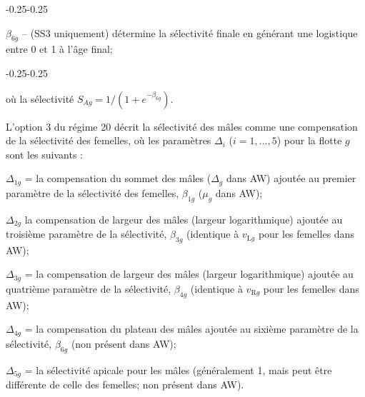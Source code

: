 \documentclass[11pt]{book}
\begin{document}
\begin{enumerate_itemize}{}{}
\begin{enumerate_itemize}{-0.25}{-0.25}
    \end{enumerate_itemize}
  \item $\beta_{6g}$ -- (SS3 uniquement) d\'{e}termine la s\'{e}lectivit\'{e} finale en g\'{e}n\'{e}rant une logistique entre 0 et 1 \`{a} l'\^{a}ge final;
    \begin{enumerate_itemize}{-0.25}{-0.25}
      \item o\`{u} la s\'{e}lectivit\'{e} $S_{Ag} = 1/(1+e^{-\beta_{6g}})$.
    \end{enumerate_itemize}
\end{enumerate_itemize}

L'option 3 du r\'{e}gime 20 d\'{e}crit la s\'{e}lectivit\'{e} des m\^{a}les comme une compensation de la s\'{e}lectivit\'{e} des femelles, o\`{u} les param\`{e}tres $\Delta_i$ ($i=1,...,5$) pour la flotte $g$ sont les suivants :
\begin{enumerate_csas}{}{}
\item $\Delta_{1g}$ = la compensation du sommet des m\^{a}les ($\Delta_g$ dans AW) ajout\'{e}e au premier param\`{e}tre de la s\'{e}lectivit\'{e} des femelles, $\beta_{1g}$ ($\mu_g$ dans AW);
\item $\Delta_{2g}$ la compensation de largeur des m\^{a}les (largeur logarithmique) ajout\'{e}e au troisi\`{e}me param\`{e}tre de la s\'{e}lectivit\'{e}, $\beta_{3g}$ (identique \`{a} $v_{\text{L}g}$ pour les femelles dans AW);
\item $\Delta_{3g}$ = la compensation de largeur des m\^{a}les (largeur logarithmique) ajout\'{e}e au quatri\`{e}me param\`{e}tre de la s\'{e}lectivit\'{e}, $\beta_{4g}$ (identique \`{a} $v_{\text{R}g}$ pour les femelles dans AW);
\item $\Delta_{4g}$ = la compensation du plateau des m\^{a}les ajout\'{e}e au sixi\`{e}me param\`{e}tre de la s\'{e}lectivit\'{e}, $\beta_{6g}$ (non pr\'{e}sent dans AW);
\item $\Delta_{5g}$ = la s\'{e}lectivit\'{e} apicale pour les m\^{a}les (g\'{e}n\'{e}ralement 1, mais peut \^{e}tre diff\'{e}rente de celle des femelles; non pr\'{e}sent dans AW).
\end{enumerate_csas}
\end{document}
